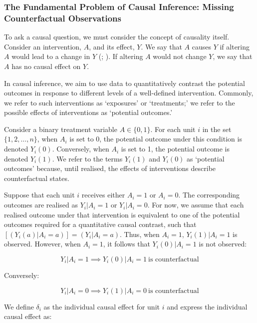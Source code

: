 \documentclass[
  single column]{article}
\begin{document}
\subsubsection{The Fundamental Problem of Causal Inference: Missing
Counterfactual
Observations}\label{the-fundamental-problem-of-causal-inference-missing-counterfactual-observations}

To ask a causal question, we must consider the concept of causality
itself. Consider an intervention, \(A\), and its effect, \(Y\). We say
that \(A\) causes \(Y\) if altering \(A\) would lead to a change in
\(Y\) (;
). If altering \(A\) would not
change \(Y\), we say that \(A\) has no causal effect on \(Y\).

In causal inference, we aim to use data to quantitatively contrast the
potential outcomes in response to different levels of a well-defined
intervention. Commonly, we refer to such interventions as `exposures' or
`treatments;' we refer to the possible effects of interventions as
`potential outcomes.'

Consider a binary treatment variable \(A \in \{0,1\}\). For each unit
\(i\) in the set \(\{1, 2, \ldots, n\}\), when \(A_i\) is set to 0, the
potential outcome under this condition is denoted \(Y_i(0)\).
Conversely, when \(A_i\) is set to 1, the potential outcome is denoted
\(Y_i(1)\). We refer to the terms \(Y_i(1)\) and \(Y_i(0)\) as
`potential outcomes' because, until realised, the effects of
interventions describe counterfactual states.

Suppose that each unit \(i\) receives either \(A_i = 1\) or \(A_i = 0\).
The corresponding outcomes are realised as \(Y_i|A_i = 1\) or
\(Y_i|A_i = 0\). For now, we assume that each realised outcome under
that intervention is equivalent to one of the potential outcomes
required for a quantitative causal contrast, such that
\([(Y_i(a)|A_i = a)] = (Y_i|A_i = a)\). Thus, when \(A_i = 1\),
\(Y_i(1)|A_i = 1\) is observed. However, when \(A_i = 1\), it follows
that \(Y_i(0)|A_i = 1\) is not observed:

\[
Y_i|A_i = 1 \implies Y_i(0)|A_i = 1~ \text{is counterfactual}
\]

Conversely:

\[
Y_i|A_i = 0 \implies Y_i(1)|A_i = 0~ \text{is counterfactual}
\]

We define \(\delta_i\) as the individual causal effect for unit \(i\)
and express the individual causal effect as:
\end{document}
